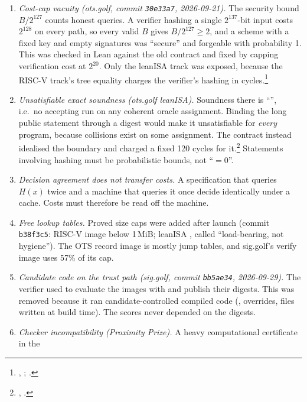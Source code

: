 \begin{enumerate}[nosep,label=(\arabic*)]
\item \emph{Cost-cap vacuity (ots.golf, commit \texttt{30e33a7}, 2026-09-21).} The security bound
  $B/2^{127}$ counts honest queries. A verifier hashing a single $2^{137}$-bit input costs $2^{128}$
  on every path, so every valid $B$ gives $B/2^{127}\ge2$, and a scheme with a fixed key and empty
  signatures was ``secure'' and forgeable with probability 1. This was checked in Lean against
  the old contract and fixed by capping verification cost at $2^{20}$. Only the leanISA track was
  exposed, because the RISC-V track's tree equality charges the verifier's hashing in
  cycles.\footnote{, ;
  .}
\item \emph{Unsatisfiable exact soundness (ots.golf leanISA).} Soundness there is
  ``'', i.e.\ no accepting run on any coherent oracle assignment.
  Binding the long public statement through a digest would make it unsatisfiable for \emph{every}
  program, because collisions exist on some assignment. The contract instead idealised the
  boundary and charged a fixed 120 cycles for it.\footnote{,
  .} Statements involving hashing must be
  probabilistic bounds, not ``$=0$''.
\item \emph{Decision agreement does not transfer costs.} A specification that queries $H(x)$
  twice and a machine that queries it once decide identically under a cache. Costs must therefore
  be read off the machine.
\item \emph{Free lookup tables.} Proved size caps were added after launch (commit \texttt{b38f3c5}:
  RISC-V image below 1\,MiB; leanISA , called ``load-bearing, not
  hygiene''). The OTS record image is mostly jump tables, and sig.golf's verify image uses 57\% of
  its cap.
\item \emph{Candidate code on the trust path (sig.golf, commit \texttt{bb5ae34}, 2026-09-29).} The
  verifier used to evaluate the images with  and publish their digests. This was
  removed because it ran candidate-controlled compiled code (, 
  overrides, files written at build time). The scores never depended on the digests.
\item \emph{Checker incompatibility (Proximity Prize).} A heavy computational certificate in the

\end{enumerate}
